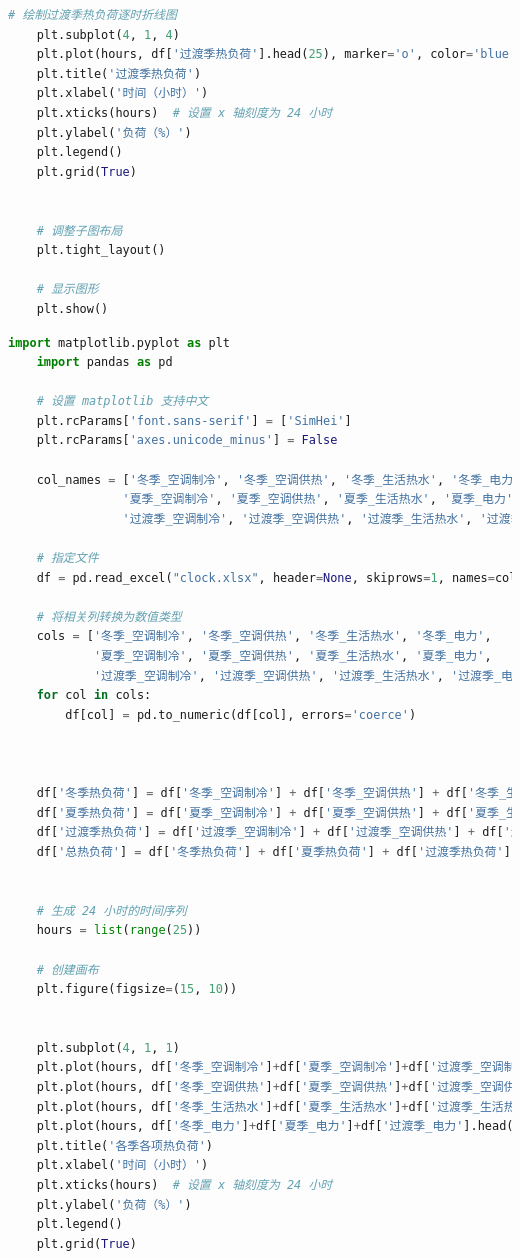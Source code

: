 \documentclass[UTF8]{ctexart}
\begin{document}
\begin{lstlisting}[language=Python]
    # 绘制过渡季热负荷逐时折线图
    plt.subplot(4, 1, 4)
    plt.plot(hours, df['过渡季热负荷'].head(25), marker='o', color='blue', label='过渡季热负荷')
    plt.title('过渡季热负荷')
    plt.xlabel('时间（小时）')
    plt.xticks(hours)  # 设置 x 轴刻度为 24 小时
    plt.ylabel('负荷（%）')
    plt.legend()
    plt.grid(True)
    
    
    # 调整子图布局
    plt.tight_layout()
    
    # 显示图形
    plt.show()
\end{lstlisting}

\begin{lstlisting}[language=Python]
    import matplotlib.pyplot as plt
    import pandas as pd

    # 设置 matplotlib 支持中文
    plt.rcParams['font.sans-serif'] = ['SimHei']
    plt.rcParams['axes.unicode_minus'] = False

    col_names = ['冬季_空调制冷', '冬季_空调供热', '冬季_生活热水', '冬季_电力', 
                '夏季_空调制冷', '夏季_空调供热', '夏季_生活热水', '夏季_电力', 
                '过渡季_空调制冷', '过渡季_空调供热', '过渡季_生活热水', '过渡季_电力']

    # 指定文件
    df = pd.read_excel("clock.xlsx", header=None, skiprows=1, names=col_names)   

    # 将相关列转换为数值类型
    cols = ['冬季_空调制冷', '冬季_空调供热', '冬季_生活热水', '冬季_电力', 
            '夏季_空调制冷', '夏季_空调供热', '夏季_生活热水', '夏季_电力', 
            '过渡季_空调制冷', '过渡季_空调供热', '过渡季_生活热水', '过渡季_电力']
    for col in cols:
        df[col] = pd.to_numeric(df[col], errors='coerce')



    df['冬季热负荷'] = df['冬季_空调制冷'] + df['冬季_空调供热'] + df['冬季_生活热水'] + df['冬季_电力']
    df['夏季热负荷'] = df['夏季_空调制冷'] + df['夏季_空调供热'] + df['夏季_生活热水'] + df['夏季_电力']
    df['过渡季热负荷'] = df['过渡季_空调制冷'] + df['过渡季_空调供热'] + df['过渡季_生活热水'] + df['过渡季_电力']
    df['总热负荷'] = df['冬季热负荷'] + df['夏季热负荷'] + df['过渡季热负荷']


    # 生成 24 小时的时间序列
    hours = list(range(25))

    # 创建画布
    plt.figure(figsize=(15, 10))


    plt.subplot(4, 1, 1)
    plt.plot(hours, df['冬季_空调制冷']+df['夏季_空调制冷']+df['过渡季_空调制冷'].head(25), marker='o', color='blue', label='总空调制冷')
    plt.plot(hours, df['冬季_空调供热']+df['夏季_空调供热']+df['过渡季_空调供热'].head(25), marker='o', color='red', label='总空调供热')
    plt.plot(hours, df['冬季_生活热水']+df['夏季_生活热水']+df['过渡季_生活热水'].head(25), marker='o', color='green', label='总生活热水')
    plt.plot(hours, df['冬季_电力']+df['夏季_电力']+df['过渡季_电力'].head(25), marker='o', color='black', label='总电力')
    plt.title('各季各项热负荷')
    plt.xlabel('时间（小时）')
    plt.xticks(hours)  # 设置 x 轴刻度为 24 小时
    plt.ylabel('负荷（%）')
    plt.legend()
    plt.grid(True)



\end{lstlisting}
\end{document}
